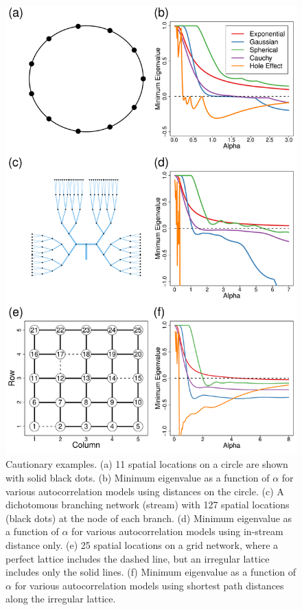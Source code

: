 \documentclass[11pt, titlepage]{article}\usepackage[]{graphicx}\usepackage[]{color}
\begin{document}
\begin{spacing}{1.9}
\begin{flushleft}
\begin{singlespace}


	\begin{figure}[H]
	  \begin{center}
	    \includegraphics[width=.7\linewidth]{figure/Fig-CautionEx-1.pdf}
	  \end{center}
	  \caption{Cautionary examples. (a) 11 spatial locations on a circle are shown with solid black dots. (b) Minimum eigenvalue as a function of $\alpha$ for various autocorrelation models using distances on the circle. (c) A dichotomous branching network (stream) with 127 spatial locations (black dots) at the node of each branch. (d) Minimum eigenvalue as a function of $\alpha$ for various autocorrelation models using in-stream distance only. (e) 25 spatial locations on a grid network, where a perfect lattice includes the dashed line, but an irregular lattice includes only the solid lines. (f) Minimum eigenvalue as a function of $\alpha$  for various autocorrelation models using shortest path distances along the irregular lattice. \label{fig:cautionEx}}
  \end{figure}


\end{singlespace}
\end{flushleft}
\end{spacing}
\end{document}
